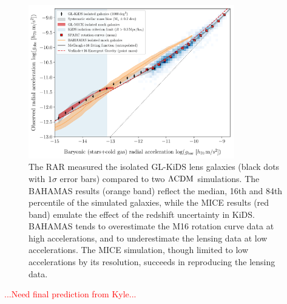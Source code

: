 \documentclass[usenatbib]{mnras}
\newcommand{\lcdm}{{\rm \Lambda CDM}}
\begin{document}
\begin{figure}
	\includegraphics[width=0.8\textwidth]{Figures/RAR_KiDS+MICE+Bahamas+Verlinde_No_Nobins_isolated_zoomout.pdf}
	\caption{The RAR measured the isolated GL-KiDS lens galaxies (black dots with $1\sigma$ error bars) compared to two $\lcdm$ simulations. The BAHAMAS results (orange band) reflect the median, 16th and 84th percentile of the simulated galaxies, while the MICE results (red band) emulate the effect of the redshift uncertainty in KiDS. BAHAMAS tends to overestimate the M16 rotation curve data at high accelerations, and to underestimate the lensing data at low accelerations. The MICE simulation, though limited to low accelerations by its resolution, succeeds in reproducing the lensing data.}
	\label{fig:RAR_kids_mice_bahamas}
\end{figure}

\textcolor{red}{...Need final prediction from Kyle...}
\end{document}
